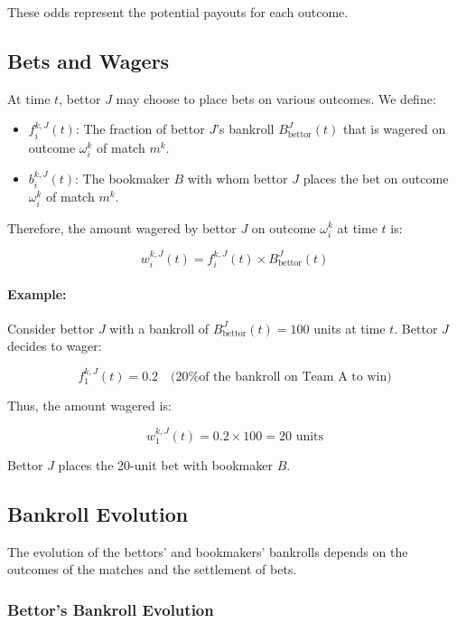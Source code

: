 These odds represent the potential payouts for each outcome.

\subsection{Bets and Wagers}

At time \( t \), bettor \( J \) may choose to place bets on various outcomes. We define:

\begin{itemize}
    \item \( f_i^{k,J}(t) \): The fraction of bettor \( J \)'s bankroll \( B_{\text{bettor}}^J(t) \) that is wagered on outcome \( \omega_i^k \) of match \( m^k \).
    \item \( b_i^{k,J}(t) \): The bookmaker \( B \) with whom bettor \( J \) places the bet on outcome \( \omega_i^k \) of match \( m^k \).
\end{itemize}

Therefore, the amount wagered by bettor \( J \) on outcome \( \omega_i^k \) at time \( t \) is:

\[
w_i^{k,J}(t) = f_i^{k,J}(t) \times B_{\text{bettor}}^J(t)
\]


\paragraph{Example:}
Consider bettor \( J \) with a bankroll of \( B_{\text{bettor}}^J(t) = 100 \) units at time \( t \). Bettor \( J \) decides to wager:

\[
f_1^{k,J}(t) = 0.2 \quad \text{(20\% of the bankroll on Team A to win)}
\]

Thus, the amount wagered is:

\[
w_1^{k,J}(t) = 0.2 \times 100 = 20 \text{ units}
\] 

Bettor \( J \) places the 20-unit bet with bookmaker \( B \).

\subsection{Bankroll Evolution}

The evolution of the bettors' and bookmakers' bankrolls depends on the outcomes of the matches and the settlement of bets.

\subsubsection{Bettor's Bankroll Evolution}

